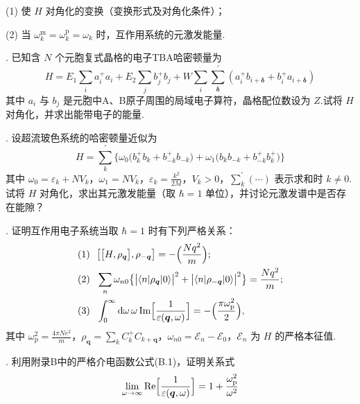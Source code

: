 (1) 使 $H$ 对角化的变换（变换形式及对角化条件）；

(2) 当 $\omega_{k}^{\mathrm{m}}=\omega_{k}^{\mathrm{p}}=\omega_{k}$ 时，互作用系统的元激发能量.

{.} 已知含 $N$ 个元胞复式晶格的电子TBA哈密顿量为
\begin{equation*}
  H=E_{1}\sum_{i}a^{+}_{i}a_{i}+E_{2}\sum_{j}b^{+}_{j}b_{j}
  +W\sum_{i}\sum_{\boldsymbol{\delta}}^{\prime}
  \left(a^{+}_{i}b_{i+\boldsymbol{\delta}}+b^{+}_{i}a_{i+\boldsymbol{\delta}}\right)
\end{equation*}
其中 $a_{i}$ 与 $b_{j}$ 是元胞中A、B原子周围的局域电子算符，晶格配位数设为 $Z$.试将 $H$ 对角化，并求出能带电子的能量.

{.} 设超流玻色系统的哈密顿量近似为
\begin{equation*}
  H=\sum_{k}^{\prime}\bigl\{\omega_{0}\bigl(b^{+}_{k}b_{k}+b^{+}_{-k}b_{-k}\bigr)
  +\omega_{1}\bigl(b_{k}b_{-k}+b^{+}_{-k}b^{+}_{k}\bigr)\bigr\}
\end{equation*}
其中 $\omega_{0}=\varepsilon_{k}+NV_{k}$，$\omega_{1}=NV_{k}$，$\varepsilon_{k}=\frac{k^{2}}{2M}$，$V_{k}>0$，$\sum_{k}^{\prime}(\cdots)$ 表示求和时 $k\neq0$.试将 $H$ 对角化，求出其元激发能量（取 $\hbar=1$ 单位），并讨论元激发谱中是否存在能隙？

{.} 证明互作用电子系统当取 $\hbar=1$ 时有下列严格关系：
\begin{equation*}
\begin{aligned}
  &\text{(1)}\ \ \bigl[\bigl[H,\rho_{\boldsymbol{q}}\bigr],\rho_{-\boldsymbol{q}}\bigr]
  =-\Bigl(\frac{Nq^{2}}{m}\Bigr);\\
  &\text{(2)}\ \ \sum_{n}\omega_{n0}\bigl\{\bigl|\langle n|\rho_{\boldsymbol{q}}|0\rangle\bigr|^{2}
  +\bigl|\langle n|\rho_{-\boldsymbol{q}}|0\rangle\bigr|^{2}\bigr\}=\frac{Nq^{2}}{m};\\
  &\text{(3)}\ \ \int_{0}^{\infty}\mathrm{d}\omega\,\omega\,
  \mathrm{Im}\Bigl[\frac{1}{\varepsilon(\boldsymbol{q},\omega)}\Bigr]
  =-\Bigl(\frac{\pi\omega_{\mathrm{p}}^{2}}{2}\Bigr),
\end{aligned}
\end{equation*}
其中 $\omega_{\mathrm{p}}^{2}=\frac{4\pi Ne^{2}}{m}$，$\rho_{\boldsymbol{q}}=\sum_{k}C^{+}_{k}C_{k+\boldsymbol{q}}$，$\omega_{n0}=\mathcal{E}_{n}-\mathcal{E}_{0}$，$\mathcal{E}_{n}$ 为 $H$ 的严格本征值.

{.} 利用附录B中的严格介电函数公式(B.1)，证明关系式
\begin{equation*}
  \lim_{\omega\to\infty}\mathrm{Re}\Bigl[\frac{1}{\varepsilon(\boldsymbol{q},\omega)}\Bigr]=1+\frac{\omega_{\mathrm{p}}^{2}}{\omega^{2}}
\end{equation*}

